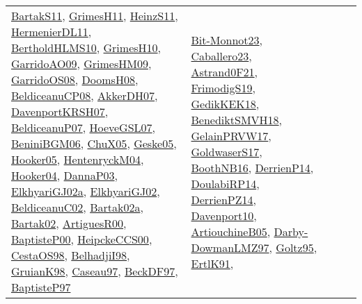 {\begin{longtable}{lp{3cm}>{\raggedright}p{6cm}>{\raggedright}p{6cm}p{8cm}}
\href{articles/BartakS11.pdf}{BartakS11}\cite{BartakS11}, \href{papers/GrimesH11.pdf}{GrimesH11}\cite{GrimesH11}, \href{papers/HeinzS11.pdf}{HeinzS11}\cite{HeinzS11}, \href{papers/HermenierDL11.pdf}{HermenierDL11}\cite{HermenierDL11}, \href{papers/BertholdHLMS10.pdf}{BertholdHLMS10}\cite{BertholdHLMS10}, \href{papers/GrimesH10.pdf}{GrimesH10}\cite{GrimesH10}, \href{articles/GarridoAO09.pdf}{GarridoAO09}\cite{GarridoAO09}, \href{papers/GrimesHM09.pdf}{GrimesHM09}\cite{GrimesHM09}, \href{articles/GarridoOS08.pdf}{GarridoOS08}\cite{GarridoOS08}, \href{papers/DoomsH08.pdf}{DoomsH08}\cite{DoomsH08}, \href{papers/BeldiceanuCP08.pdf}{BeldiceanuCP08}\cite{BeldiceanuCP08}, \href{papers/AkkerDH07.pdf}{AkkerDH07}\cite{AkkerDH07}, \href{papers/DavenportKRSH07.pdf}{DavenportKRSH07}\cite{DavenportKRSH07}, \href{papers/BeldiceanuP07.pdf}{BeldiceanuP07}\cite{BeldiceanuP07}, \href{papers/HoeveGSL07.pdf}{HoeveGSL07}\cite{HoeveGSL07}, \href{papers/BeniniBGM06.pdf}{BeniniBGM06}\cite{BeniniBGM06}, \href{papers/ChuX05.pdf}{ChuX05}\cite{ChuX05}, \href{papers/Geske05.pdf}{Geske05}\cite{Geske05}, \href{articles/Hooker05.pdf}{Hooker05}\cite{Hooker05}, \href{papers/HentenryckM04.pdf}{HentenryckM04}\cite{HentenryckM04}, \href{papers/Hooker04.pdf}{Hooker04}\cite{Hooker04}, \href{papers/DannaP03.pdf}{DannaP03}\cite{DannaP03}, \href{papers/ElkhyariGJ02a.pdf}{ElkhyariGJ02a}\cite{ElkhyariGJ02a}, \href{papers/ElkhyariGJ02.pdf}{ElkhyariGJ02}\cite{ElkhyariGJ02}, \href{papers/BeldiceanuC02.pdf}{BeldiceanuC02}\cite{BeldiceanuC02}, \href{papers/Bartak02a.pdf}{Bartak02a}\cite{Bartak02a}, \href{papers/Bartak02.pdf}{Bartak02}\cite{Bartak02}, \href{articles/ArtiguesR00.pdf}{ArtiguesR00}\cite{ArtiguesR00}, \href{articles/BaptisteP00.pdf}{BaptisteP00}\cite{BaptisteP00}, \href{articles/HeipckeCCS00.pdf}{HeipckeCCS00}\cite{HeipckeCCS00}, \href{papers/CestaOS98.pdf}{CestaOS98}\cite{CestaOS98}, \href{articles/BelhadjiI98.pdf}{BelhadjiI98}\cite{BelhadjiI98}, \href{papers/GruianK98.pdf}{GruianK98}\cite{GruianK98}, \href{papers/Caseau97.pdf}{Caseau97}\cite{Caseau97}, \href{papers/BeckDF97.pdf}{BeckDF97}\cite{BeckDF97}, \href{papers/BaptisteP97.pdf}{BaptisteP97}\cite{BaptisteP97} & \href{papers/Bit-Monnot23.pdf}{Bit-Monnot23}\cite{Bit-Monnot23}, \href{articles/Caballero23.pdf}{Caballero23}\cite{Caballero23}, \href{papers/Astrand0F21.pdf}{Astrand0F21}\cite{Astrand0F21}, \href{papers/FrimodigS19.pdf}{FrimodigS19}\cite{FrimodigS19}, \href{articles/GedikKEK18.pdf}{GedikKEK18}\cite{GedikKEK18}, \href{papers/BenediktSMVH18.pdf}{BenediktSMVH18}\cite{BenediktSMVH18}, \href{papers/GelainPRVW17.pdf}{GelainPRVW17}\cite{GelainPRVW17}, \href{papers/GoldwaserS17.pdf}{GoldwaserS17}\cite{GoldwaserS17}, \href{papers/BoothNB16.pdf}{BoothNB16}\cite{BoothNB16}, \href{papers/DerrienP14.pdf}{DerrienP14}\cite{DerrienP14}, \href{papers/DoulabiRP14.pdf}{DoulabiRP14}\cite{DoulabiRP14}, \href{papers/DerrienPZ14.pdf}{DerrienPZ14}\cite{DerrienPZ14}, \href{papers/Davenport10.pdf}{Davenport10}\cite{Davenport10}, \href{papers/ArtiouchineB05.pdf}{ArtiouchineB05}\cite{ArtiouchineB05}, \href{articles/Darby-DowmanLMZ97.pdf}{Darby-DowmanLMZ97}\cite{Darby-DowmanLMZ97}, \href{papers/Goltz95.pdf}{Goltz95}\cite{Goltz95}, \href{papers/ErtlK91.pdf}{ErtlK91}\cite{ErtlK91}, 
\end{longtable}}
